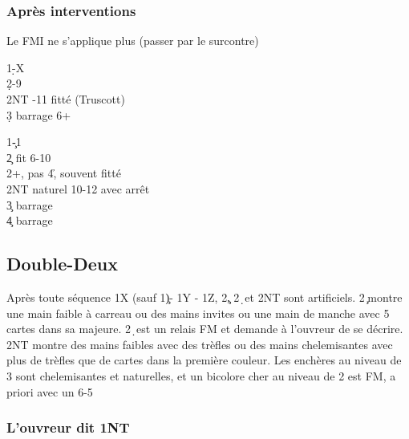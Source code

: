 \documentclass[a4paper]{article}
\begin{document}
\subsubsection{Après interventions}

Le FMI ne s'applique plus (passer par le surcontre)

\begin{bidtable}
1\d-X\+\\
2\d {}-9\\
2NT -11 fitté (Truscott)\\
3\d \> barrage 6+\-
\end{bidtable}

\begin{bidtable}
1\c-1\s\+\\
2\c \> fit 6-10\\
2\s {}+, pas 4\h , souvent fitté \c \\
2NT \> naturel 10-12 avec arrêt\\
3\c \> barrage\\
4\c \> barrage\-
\end{bidtable}

\subsection{Double-Deux}

Après toute séquence 1X (sauf 1\c )- 1Y - 1Z, 2\c , 2\d\ et 2NT sont artificiels. 2\c\ montre
une main faible à carreau ou des mains invites ou une main de manche avec 5 cartes
dans sa majeure. 2\d\ est un relais FM et demande à l'ouvreur de se décrire.
2NT montre des mains faibles avec des trèfles ou des mains chelemisantes avec plus de
trèfles que de cartes dans la première couleur.
Les enchères au niveau de 3 sont chelemisantes et naturelles, et un bicolore cher
au niveau de 2 est FM, a priori avec un 6-5

\subsubsection{L'ouvreur dit 1NT}
\end{document}
